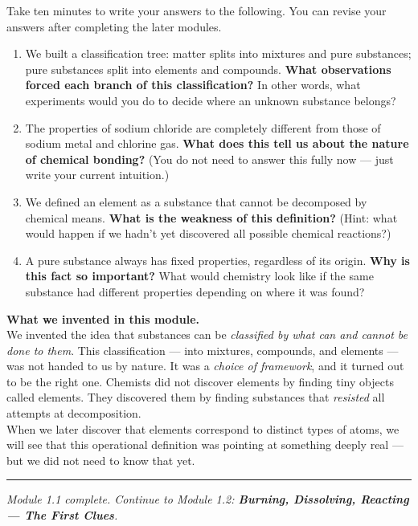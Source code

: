 \documentclass[12pt, a4paper]{book}
\theoremstyle{definition}
\begin{document}
\begin{reflectionbox}
Take ten minutes to write your answers to the following.
You can revise your answers after completing the later modules.

\begin{enumerate}[label=\textbf{R\arabic*.}]
  \item We built a classification tree: matter splits into
        mixtures and pure substances; pure substances split into
        elements and compounds.
        \textbf{What observations forced each branch of this classification?}
        In other words, what experiments would you do to decide
        where an unknown substance belongs?

  \item The properties of sodium chloride are completely different
        from those of sodium metal and chlorine gas.
        \textbf{What does this tell us about the nature of chemical bonding?}
        (You do not need to answer this fully now — just write
        your current intuition.)

  \item We defined an element as a substance that cannot be decomposed
        by chemical means.
        \textbf{What is the weakness of this definition?}
        (Hint: what would happen if we hadn't yet discovered
        all possible chemical reactions?)

  \item A pure substance always has fixed properties,
        regardless of its origin.
        \textbf{Why is this fact so important?}
        What would chemistry look like if the same substance
        had different properties depending on where it was found?
\end{enumerate}
\end{reflectionbox}

\vspace{1.5em}

\begin{center}
\begin{tcolorbox}[
  enhanced, colback=DiscoveryColor!8, colframe=DiscoveryColor,
  width=0.88\textwidth, arc=3pt
]
\centering\sffamily\small
\textbf{What we invented in this module.}\\[4pt]
We invented the idea that substances can be \emph{classified by
what can and cannot be done to them}.
This classification — into mixtures, compounds, and elements —
was not handed to us by nature. It was a \emph{choice of framework},
and it turned out to be the right one.
Chemists did not discover elements by finding tiny objects called elements.
They discovered them by finding substances that \emph{resisted}
all attempts at decomposition.\\[4pt]
When we later discover that elements correspond to distinct types of atoms,
we will see that this operational definition was pointing at
something deeply real — but we did not need to know that yet.
\end{tcolorbox}
\end{center}

\vspace{2em}
\noindent\textcolor{JourneyColor!40}{\rule{\textwidth}{0.6pt}}
\begin{center}
\textit{\sffamily\small
Module 1.1 complete. Continue to Module 1.2:
\textbf{Burning, Dissolving, Reacting — The First Clues}.}
\end{center}
\end{document}

